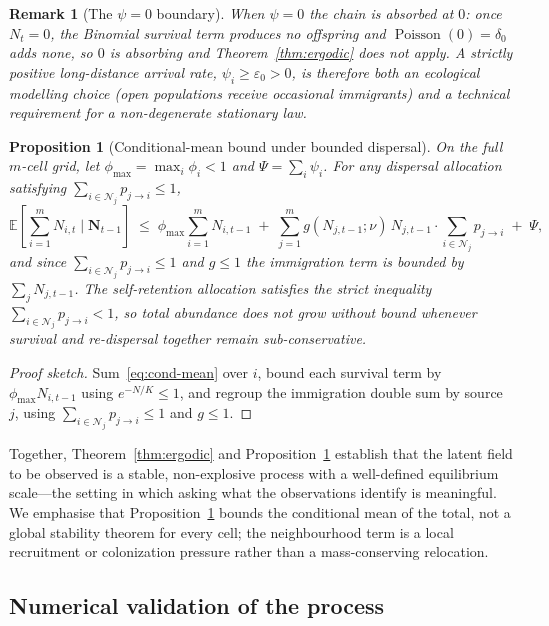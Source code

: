 \documentclass[preprint,12pt]{elsarticle}
\newtheorem{proposition}[theorem]{Proposition}
\newtheorem{remark}{Remark}
\theoremstyle{definition}
\newcommand{\E}{\mathbb{E}}
\newcommand{\Pois}{\operatorname{Poisson}}
\begin{document}
\begin{remark}[The $\psi=0$ boundary]
When $\psi=0$ the chain is absorbed at $0$: once $N_t=0$, the Binomial
survival term produces no offspring and $\Pois(0)=\delta_0$ adds none, so
$0$ is absorbing and Theorem~\ref{thm:ergodic} does not apply. A strictly
positive long-distance arrival rate, $\psi_i\ge\varepsilon_0>0$, is
therefore both an ecological modelling choice (open populations receive
occasional immigrants) and a technical requirement for a non-degenerate
stationary law.
\end{remark}

\begin{proposition}[Conditional-mean bound under bounded dispersal]
\label{prop:meanbound}
On the full $m$-cell grid, let $\phi_{\max}=\max_i\phi_i<1$ and
$\Psi=\sum_i\psi_i$. For any dispersal allocation satisfying
$\sum_{i\in\mathcal{N}_j}p_{j\to i}\le1$,
\[
  \E\!\left[\sum_{i=1}^m N_{i,t}\;\Big|\;\mathbf{N}_{t-1}\right]
  \;\le\;
  \phi_{\max}\sum_{i=1}^m N_{i,t-1}
  \;+\;\sum_{j=1}^m g(N_{j,t-1};\nu)\,N_{j,t-1}\cdot\!\!
       \sum_{i\in\mathcal{N}_j}p_{j\to i}
  \;+\;\Psi ,
\]
and since $\sum_{i\in\mathcal{N}_j}p_{j\to i}\le1$ and $g\le1$ the
immigration term is bounded by $\sum_j N_{j,t-1}$. The self-retention
allocation satisfies the strict inequality
$\sum_{i\in\mathcal{N}_j}p_{j\to i}<1$, so total abundance does not grow
without bound whenever survival and re-dispersal together remain
sub-conservative.
\end{proposition}

\begin{proof}[Proof sketch]
Sum~\eqref{eq:cond-mean} over $i$, bound each survival term by
$\phi_{\max}N_{i,t-1}$ using $e^{-N/K}\le1$, and regroup the immigration
double sum by source $j$, using
$\sum_{i\in\mathcal{N}_j}p_{j\to i}\le1$ and $g\le1$.
\end{proof}

Together, Theorem~\ref{thm:ergodic} and Proposition~\ref{prop:meanbound}
establish that the latent field to be observed is a stable, non-explosive
process with a well-defined equilibrium scale---the setting in which asking
what the observations identify is meaningful. We emphasise that
Proposition~\ref{prop:meanbound} bounds the conditional mean of the total,
not a global stability theorem for every cell; the neighbourhood term is a
local recruitment or colonization pressure rather than a mass-conserving
relocation.

\subsection{Numerical validation of the process}
\label{sec:sim-validation}
\end{document}
